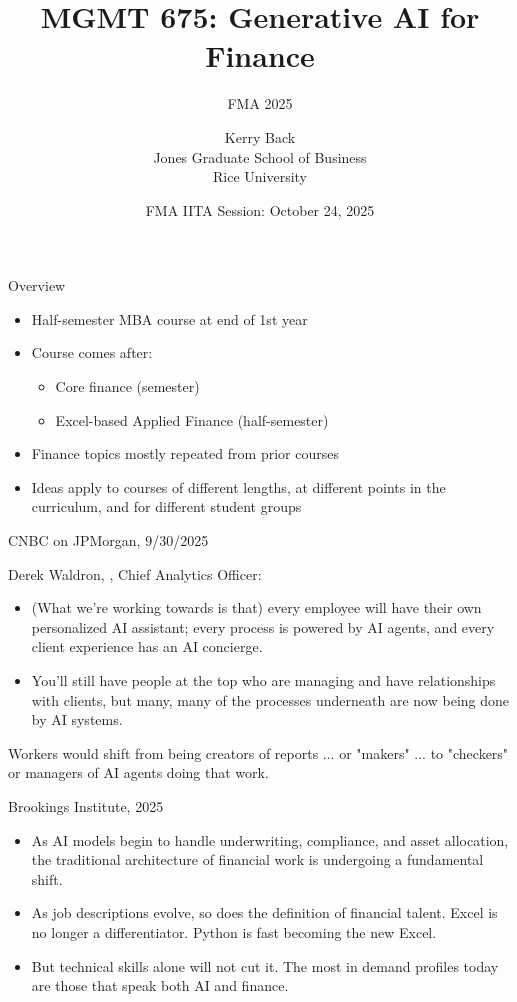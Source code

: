 \documentclass{beamer}
\title{MGMT 675: Generative AI for Finance}
\subtitle{FMA 2025}
\date{FMA IITA Session: October 24, 2025}
\author{Kerry Back\\ 
Jones Graduate School of Business\\
Rice University}
\begin{document}
\maketitle


\begin{frame}{Overview}
    \begin{itemize}
    \item Half-semester MBA course at end of 1st year
    \item Course comes after: 
    \begin{itemize}
    \item Core finance (semester) 
    \item Excel-based Applied Finance (half-semester)
    \end{itemize}
    \item Finance topics mostly repeated from prior courses
    \item Ideas apply to courses of different lengths, at different points in the curriculum, and for different student groups
    \end{itemize}

\end{frame}


\begin{frame}{CNBC on JPMorgan, 9/30/2025}

Derek Waldron, , Chief Analytics Officer:
\begin{itemize}
\item (What we're working towards is that) every employee will have their own personalized AI assistant; every process is powered by AI agents, and every client experience has an AI concierge.
\item You'll still have people at the top who are managing and have relationships with clients, but many, many of the processes underneath are now being done by AI systems.
\end{itemize}


Workers would shift from being creators of reports ... or "makers" ... to "checkers" or managers of AI agents doing that work.

\end{frame}

\begin{frame}{Brookings Institute, 2025}

\begin{itemize}
\item As AI models begin to handle underwriting, compliance, and asset allocation, the traditional architecture of financial work is undergoing a fundamental shift.
\item As job descriptions evolve, so does the definition of financial talent. Excel is no longer a differentiator. Python is fast becoming the new Excel. 
\item But technical skills alone will not cut it. The most in demand profiles today are those that speak both AI and finance.
\end{itemize}
\end{frame}
\end{document}
